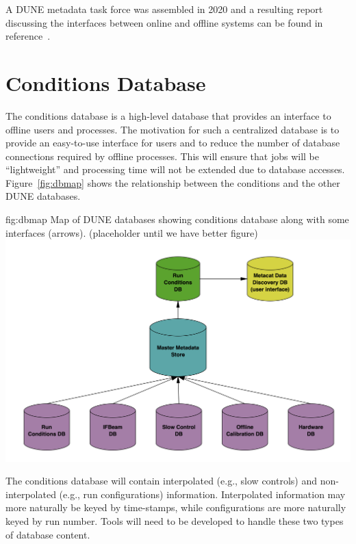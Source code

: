 \documentclass[../main-v1.tex]{subfiles}
\begin{document}
A DUNE metadata task force was assembled in 2020 and a resulting report discussing the interfaces between online and offline systems can be found in reference~\cite{bib:docdb22983}.

\section{Conditions Database  }
\label{sec:db:conditions} 

The conditions database is a high-level database that provides an interface to offline users and processes. The motivation for such a centralized database is to provide an easy-to-use interface for users and to reduce the number of database connections required by offline processes. This will ensure that jobs will be ``lightweight'' and processing time will not be extended due to database accesses. Figure~\ref{fig:dbmap} shows the relationship between the conditions  and the other DUNE databases. 


\begin{dunefigure}
{fig:dbmap} 
{Map of DUNE databases showing conditions database along with some interfaces (arrows). (placeholder until we have better figure)}
\includegraphics[width=.9\columnwidth]{graphics/Databases/DBSystem-cartoon.png}
\end{dunefigure}


The conditions database will contain interpolated (e.g., slow controls) and non-interpolated (e.g., run configurations) information. Interpolated information may more naturally be keyed by time-stamps, while configurations are more naturally keyed by run number. Tools will need to be developed to handle these two %
types of database content. 
\end{document}
